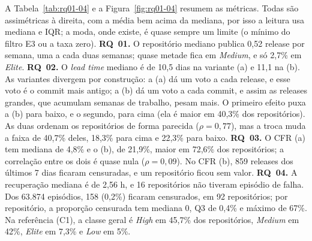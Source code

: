 \documentclass[12pt]{article}
\begin{document}
A Tabela~\ref{tab:rq01-04} e a Figura~\ref{fig:rq01-04} resumem as métricas. Todas são assimétricas à direita, com a média bem acima da
mediana, por isso a leitura usa mediana e IQR; a moda, onde existe, é quase
sempre um limite (o mínimo do filtro E3 ou a taxa zero).
\textbf{RQ~01.} O repositório mediano publica 0,52 release por semana, uma a
cada duas semanas; quase metade fica em \emph{Medium}, e só 2,7\% em
\emph{Elite}.
\textbf{RQ~02.} O \emph{lead time} mediano é de 10,5 dias na variante (a) e 11,1
na (b). As variantes divergem por construção: a (a) dá um voto a cada release,
e esse voto é o commit mais antigo; a (b) dá um voto a cada commit, e assim as
releases grandes, que acumulam semanas de trabalho, pesam mais. O primeiro efeito
puxa a (b) para baixo, e o segundo, para cima (ela é maior em 40,3\% dos
repositórios). As duas ordenam os repositórios de forma parecida
($\rho = 0{,}77$), mas a troca muda a faixa de 40,7\% deles, 18,3\% para cima e
22,3\% para baixo.
\textbf{RQ~03.} O CFR (a) tem mediana de 4,8\% e o (b), de 21,9\%, maior em
72,6\% dos repositórios; a correlação entre os dois é quase nula
($\rho = 0{,}09$). No CFR (b), 859 releases dos últimos 7 dias ficaram
censuradas, e um repositório ficou sem valor.
\textbf{RQ~04.} A recuperação mediana é de 2,56 h, e 16 repositórios não
tiveram episódio de falha. Dos 63.874 episódios, 158 (0,2\%) ficaram
censurados, em 92 repositórios; por repositório, a proporção censurada tem
mediana 0, Q3 de 0,4\% e máximo de 67\%.
Na referência (C1), a classe geral é \emph{High} em 45,7\% dos repositórios,
\emph{Medium} em 42\%, \emph{Elite} em 7,3\% e \emph{Low} em 5\%.
\end{document}
